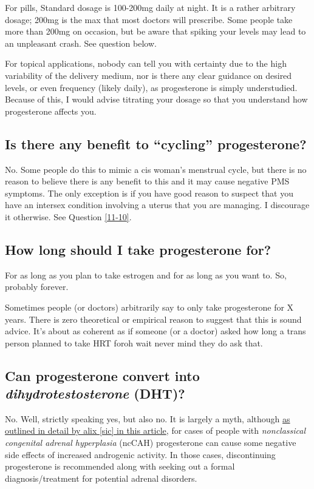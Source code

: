 \documentclass{article}
\begin{document}
For pills, Standard dosage is 100-200mg daily at night. It is a rather arbitrary dosage; 200mg is the max that most doctors will prescribe. Some people take more than 200mg on occasion, but be aware that spiking your levels may lead to an unpleasant crash. See question below.

For topical applications, nobody can tell you with certainty due to the high variability of the delivery medium, nor is there any clear guidance on desired levels, or even frequency (likely daily), as progesterone is simply understudied. Because of this, I would advise titrating your dosage so that you understand how progesterone affects you.

\subsection{Is there any benefit to “cycling” progesterone?}\label{8-11}

No. Some people do this to mimic a cis woman’s menstrual cycle, but there is no reason to believe there is any benefit to this and it may cause negative PMS symptoms. The only exception is if you have good reason to suspect that you have an intersex condition involving a uterus that you are managing. I discourage it otherwise. See Question \ref{11-10}.

\subsection{How long should I take progesterone for?}

For as long as you plan to take estrogen and for as long as you want to. So, probably forever.

Sometimes people (or doctors) arbitrarily say to only take progesterone for X years. There is zero theoretical or empirical reason to suggest that this is sound advice. It's about as coherent as if someone (or a doctor) asked how long a trans person planned to take HRT for\textemdash{}oh wait never mind they do ask that.

\subsection{Can progesterone convert into \textit{dihydrotestosterone} (DHT)?}

No. Well, strictly speaking yes, but also no. It is largely a myth, although \href{https://whsah.co/posts/rethinking-progesterone-and-androgens/}{as outlined in detail by alix [sic] in this article}, for cases of people with \textit{nonclassical congenital adrenal hyperplasia} (ncCAH) progesterone can cause some negative side effects of increased androgenic activity. In those cases, discontinuing progesterone is recommended along with seeking out a formal diagnosis/treatment for potential adrenal disorders.
\end{document}
